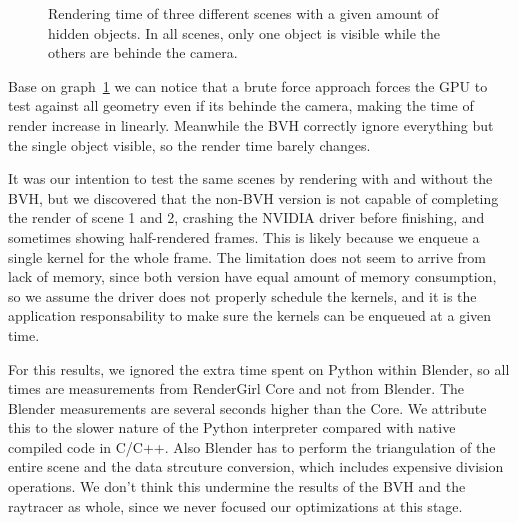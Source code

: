 \documentclass{vgtc}
\begin{document}
\begin{figure}
\centering
{}
\caption{Rendering time of three different scenes with a given amount
  of hidden objects. In all scenes, only one object is visible while
  the others are behinde the camera.}
\label{fig:bvh-no-bvh-results}
\end{figure}

Base on graph~\ref{fig:bvh-no-bvh-results} we can notice that a brute
force approach forces the GPU to test against all geometry even if its
behinde the camera, making the time of render increase in
linearly. Meanwhile the BVH correctly ignore everything but the single
object visible, so the render time barely changes.

It was our intention to test the same scenes by rendering with and
without the BVH, but we discovered that the non-BVH version is not
capable of completing the render of scene 1 and 2, crashing the NVIDIA
driver before finishing, and sometimes showing half-rendered
frames. This is likely because we enqueue a single kernel for the
whole frame. The limitation does not seem to arrive from lack of
memory, since both version have equal amount of memory consumption, so
we assume the driver does not properly schedule the kernels, and it is
the application responsability to make sure the kernels can be
enqueued at a given time.

For this results, we ignored the extra time spent on Python within
Blender, so all times are measurements from RenderGirl Core and not
from Blender. The Blender measurements are several seconds higher than
the Core. We attribute this to the slower nature of the Python
interpreter compared with native compiled code in C/C++. Also Blender
has to perform the triangulation of the entire scene and the data
strcuture conversion, which includes expensive division operations. We
don't think this undermine the results of the BVH and the raytracer as
whole, since we never focused our optimizations at this stage.
\end{document}
